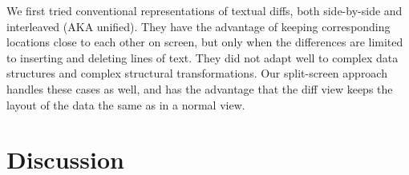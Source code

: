 \documentclass[english,submission]{programming}
\theoremstyle{definition}
\begin{document}
We first tried conventional representations of textual diffs, both side-by-side and interleaved (AKA unified). They have the advantage of keeping corresponding locations close to each other on screen, but only when the differences are limited to inserting and deleting lines of text. They did not adapt well to complex data structures and complex structural transformations. Our split-screen approach handles these cases as well, and has the advantage that the diff view keeps the layout of the data the same as in a normal view.




\section{Discussion}






\end{document}
